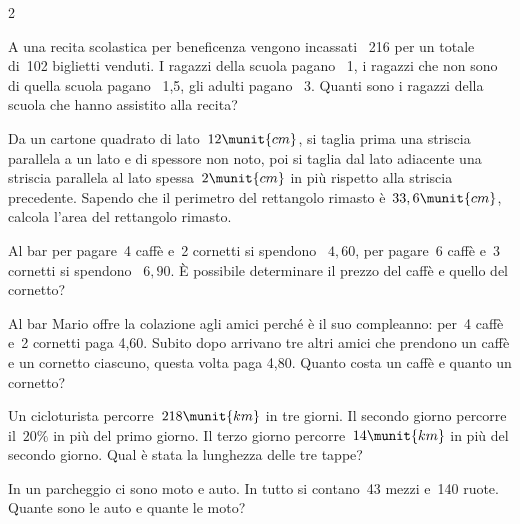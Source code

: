 \begin{htmulticols}{2}
\begin{esercizio}
 \label{ese:22.91}
A una recita scolastica per beneficenza vengono incassati
{\officialeuro}~216 per un totale di~102 biglietti venduti. 
I ragazzi della scuola pagano {\officialeuro}~1, i ragazzi che non sono 
di quella scuola pagano {\officialeuro}~1,5, gli adulti pagano 
{\officialeuro}~3. 
Quanti sono i ragazzi della scuola che hanno assistito alla recita?
\end{esercizio}


\begin{esercizio}
 \label{ese:22.92}
Da un cartone quadrato di lato~\(12\munit{cm}\), si taglia prima una 
striscia parallela a un lato e di spessore non noto, poi si taglia dal 
lato adiacente una striscia parallela al lato spessa~\(2\munit{cm}\) in 
più rispetto alla striscia precedente. 
Sapendo che il perimetro del rettangolo rimasto è~\(33,6\munit{cm}\), 
calcola l'area del rettangolo rimasto.
\end{esercizio}

\begin{esercizio}[*]
 \label{ese:22.93}
Al bar per pagare~4 caffè e~2 cornetti si spendono 
{\officialeuro}~\(4,60\), per pagare~6 caffè
e~3 cornetti si spendono {\officialeuro}~\(6,90\). 
È possibile determinare il prezzo del caffè e quello del cornetto?
\end{esercizio}

\begin{esercizio}[*]
 \label{ese:22.94}
 Al bar Mario offre la colazione agli amici perché è il suo
compleanno: per~4 caffè e~2 cornetti paga {\officialeuro}4,60. 
Subito dopo arrivano tre altri amici che prendono un caffè e un cornetto
ciascuno, questa volta paga {\officialeuro}4,80. 
Quanto costa un caffè e quanto un cornetto?
\end{esercizio}

\begin{esercizio}[*]
 \label{ese:22.95}
Un cicloturista percorre~\(218\munit{km}\) in tre giorni. 
Il secondo giorno percorre il~\(20\%\) in più del primo giorno. 
Il terzo giorno percorre~\(14\munit{km}\) in più del secondo giorno. 
Qual è stata la lunghezza delle tre tappe?
\end{esercizio}

\begin{esercizio}[*]
 \label{ese:22.96}
In un parcheggio ci sono moto e auto. In tutto si contano~43 mezzi e~140
ruote. Quante sono le auto e quante le moto?
\end{esercizio}


\end{htmulticols}
